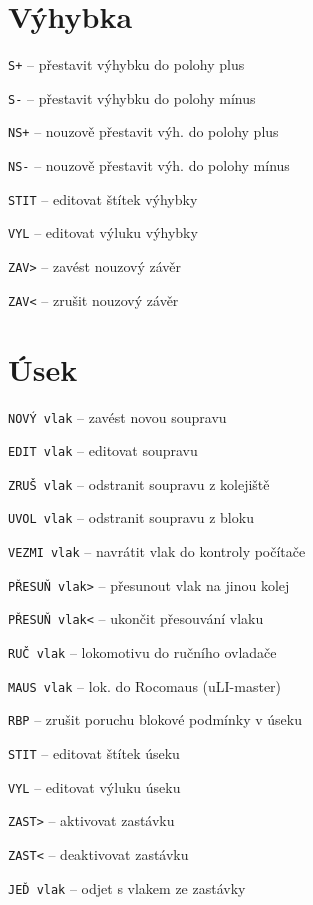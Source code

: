 \documentclass[12pt,a4paper,landscape]{article}
\begin{document}
\begin{multicols}{3}
\section{Výhybka}
\begin{compactitem}
	\item \texttt{S+} -- přestavit výhybku do polohy plus
	\item \texttt{S-} -- přestavit výhybku do polohy mínus
	\item \texttt{NS+} -- nouzově přestavit výh. do polohy plus
	\item \texttt{NS-} -- nouzově přestavit výh. do polohy mínus
	\item \texttt{STIT} -- editovat štítek výhybky
	\item \texttt{VYL} -- editovat výluku výhybky
	\item \texttt{ZAV>} -- zavést nouzový závěr
	\item \texttt{ZAV<} -- zrušit nouzový závěr
\end{compactitem}
	
\section{Úsek}
\begin{compactitem}
	\item \texttt{NOVÝ vlak} -- zavést novou soupravu
	\item \texttt{EDIT vlak} -- editovat soupravu
	\item \texttt{ZRUŠ vlak} -- odstranit soupravu z kolejiště
	\item \texttt{UVOL vlak} -- odstranit soupravu z bloku
	\item \texttt{VEZMI vlak} -- navrátit vlak do kontroly počítače
	\item \texttt{PŘESUŇ vlak>} -- přesunout vlak na jinou kolej
	\item \texttt{PŘESUŇ vlak<} -- ukončit přesouvání vlaku
	\item \texttt{RUČ vlak} -- lokomotivu do ručního ovladače
	\item \texttt{MAUS vlak} -- lok. do Rocomaus (uLI-master)
	\item \texttt{RBP} -- zrušit poruchu blokové podmínky v úseku

	\item \texttt{STIT} -- editovat štítek úseku
	\item \texttt{VYL} -- editovat výluku úseku

	\item \texttt{ZAST>} -- aktivovat zastávku
	\item \texttt{ZAST<} -- deaktivovat zastávku
	\item \texttt{JEĎ vlak} -- odjet s vlakem ze zastávky
	

\end{compactitem}
\end{multicols}
\end{document}
